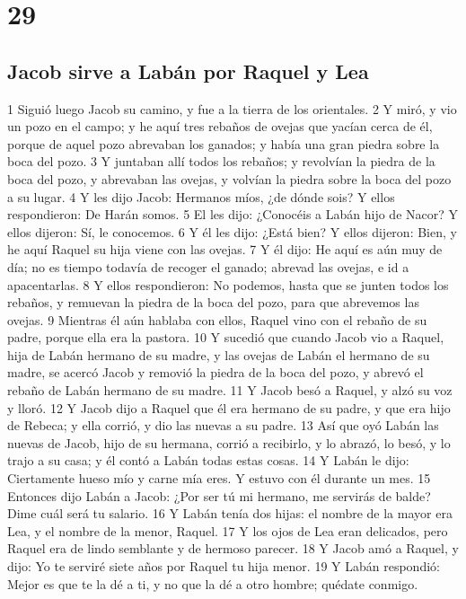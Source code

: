 \chapter{29}

\section{Jacob sirve a Labán por Raquel y Lea}

1 Siguió luego Jacob su camino, y fue a la tierra de los orientales.
2 Y miró, y vio un pozo en el campo; y he aquí tres rebaños de ovejas que yacían cerca de él, porque de aquel pozo abrevaban los ganados; y había una gran piedra sobre la boca del pozo.
3 Y juntaban allí todos los rebaños; y revolvían la piedra de la boca del pozo, y abrevaban las ovejas, y volvían la piedra sobre la boca del pozo a su lugar.
4 Y les dijo Jacob: Hermanos míos, ¿de dónde sois? Y ellos respondieron: De Harán somos.
5 El les dijo: ¿Conocéis a Labán hijo de Nacor? Y ellos dijeron: Sí, le conocemos.
6 Y él les dijo: ¿Está bien? Y ellos dijeron: Bien, y he aquí Raquel su hija viene con las ovejas.
7 Y él dijo: He aquí es aún muy de día; no es tiempo todavía de recoger el ganado; abrevad las ovejas, e id a apacentarlas.
8 Y ellos respondieron: No podemos, hasta que se junten todos los rebaños, y remuevan la piedra de la boca del pozo, para que abrevemos las ovejas.
9 Mientras él aún hablaba con ellos, Raquel vino con el rebaño de su padre, porque ella era la pastora.
10 Y sucedió que cuando Jacob vio a Raquel, hija de Labán hermano de su madre, y las ovejas de Labán el hermano de su madre, se acercó Jacob y removió la piedra de la boca del pozo, y abrevó el rebaño de Labán hermano de su madre.
11 Y Jacob besó a Raquel, y alzó su voz y lloró.
12 Y Jacob dijo a Raquel que él era hermano de su padre, y que era hijo de Rebeca; y ella corrió, y dio las nuevas a su padre.
13 Así que oyó Labán las nuevas de Jacob, hijo de su hermana, corrió a recibirlo, y lo abrazó, lo besó, y lo trajo a su casa; y él contó a Labán todas estas cosas.
14 Y Labán le dijo: Ciertamente hueso mío y carne mía eres. Y estuvo con él durante un mes.
15 Entonces dijo Labán a Jacob: ¿Por ser tú mi hermano, me servirás de balde? Dime cuál será tu salario.
16 Y Labán tenía dos hijas: el nombre de la mayor era Lea, y el nombre de la menor, Raquel.
17 Y los ojos de Lea eran delicados, pero Raquel era de lindo semblante y de hermoso parecer.
18 Y Jacob amó a Raquel, y dijo: Yo te serviré siete años por Raquel tu hija menor.
19 Y Labán respondió: Mejor es que te la dé a ti, y no que la dé a otro hombre; quédate conmigo.
